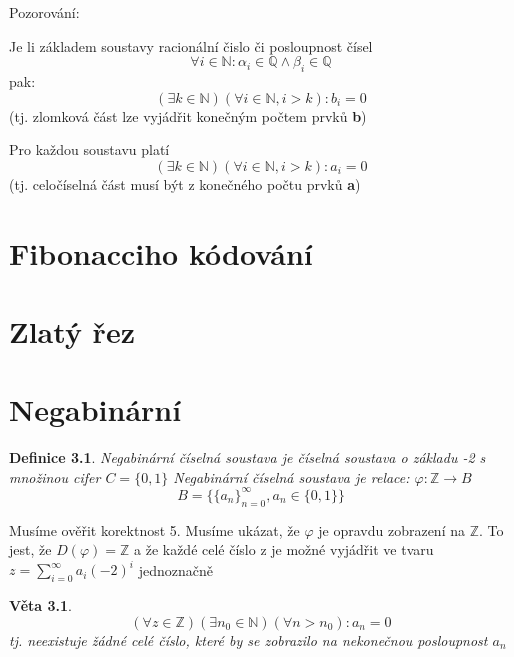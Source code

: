 \documentclass[12pt]{book}
\newtheorem{definice}{Definice}
\newtheorem{veta}{Věta}
\begin{document}
\newpage
Pozorování:


Je li základem soustavy racionální čislo či posloupnost čísel
$$\forall i \in \mathbb{N} : \alpha_i \in \mathbb{Q} \land \beta_i \in \mathbb{Q}$$
pak:
$$ (\exists k \in \mathbb{N} )(\forall i \in \mathbb{N}, i>k): b_i = 0 $$
(tj. zlomková část lze vyjádřit konečným počtem prvků \textbf{b})\newline \newline

Pro každou soustavu platí
$$ (\exists k \in \mathbb{N} )(\forall i \in \mathbb{N}, i>k): a_i = 0 $$
(tj. celočíselná část musí být  z konečného počtu prvků \textbf{a})



\newpage

\chapter{Fibonacciho kódování}

\newpage

\chapter{Zlatý řez}

\newpage

\chapter{Negabinární}

\begin{definice}
	Negabinární číselná soustava je číselná soustava o základu -2 s množinou cifer $C=\{0,1\}$\newline
	Negabinární číselná soustava je relace:
	$\varphi:\mathbb{Z}\to B$
	 $$B=\{\{a_n\}_{n=0}^\infty,a_n \in \{0,1\} \}$$
\end{definice}
Musíme ověřit korektnost 5. Musíme ukázat, že $\varphi$ je opravdu zobrazení na $\mathbb{Z}$. To jest, že $D(\varphi)=\mathbb{Z}$ a že každé celé číslo z je možné vyjádřit ve tvaru $z=\sum_{i=0}^\infty a_i(-2)^i$ jednoznačně

\begin{veta}
	$$(\forall z \in \mathbb{Z})(\exists n_0 \in \mathbb{N}) (\forall n > n_0) : a_n = 0$$tj. neexistuje žádné celé číslo, které by se zobrazilo na nekonečnou posloupnost $a_n$
	\end{veta}
\end{document}
